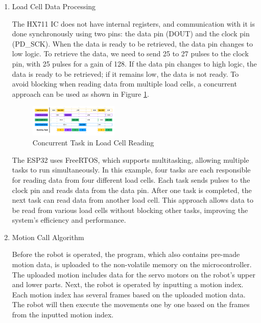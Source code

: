\begin{enumerate}[label=\Alph*.]
    \item Load Cell Data Processing
    \label{subsec:firmwaremicrocontroller}

    \hspace*{1em} The HX711 IC does not have internal registers, and communication with it is done synchronously using two pins: the data pin (DOUT) and the clock pin (PD\_SCK). When the data is ready to be retrieved, the data pin changes to low logic. To retrieve the data, we need to send 25 to 27 pulses to the clock pin, with 25 pulses for a gain of 128. If the data pin changes to high logic, the data is ready to be retrieved; if it remains low, the data is not ready. To avoid blocking when reading data from multiple load cells, a concurrent approach can be used as shown in Figure \ref{fig:Task_LoadCell}.

    \begin{figure} [h] \centering
      \includegraphics[width=0.4\textwidth]{gambar/Task_LoadCell.png}
      \caption{Concurrent Task in Load Cell Reading}
      \label{fig:Task_LoadCell}
    \end{figure}

    \hspace*{1em} The ESP32 uses FreeRTOS, which supports multitasking, allowing multiple tasks to run simultaneously. In this example, four tasks are each responsible for reading data from four different load cells. Each task sends pulses to the clock pin and reads data from the data pin. After one task is completed, the next task can read data from another load cell. This approach allows data to be read from various load cells without blocking other tasks, improving the system's efficiency and performance.

    \item Motion Call Algorithm
    \label{subsec:motionalgorithm}

    \hspace*{1em} Before the robot is operated, the program, which also contains pre-made motion data, is uploaded to the non-volatile memory on the microcontroller. The uploaded motion includes data for the servo motors on the robot's upper and lower parts. Next, the robot is operated by inputting a motion index. Each motion index has several frames based on the uploaded motion data. The robot will then execute the movements one by one based on the frames from the inputted motion index.


\end{enumerate}
